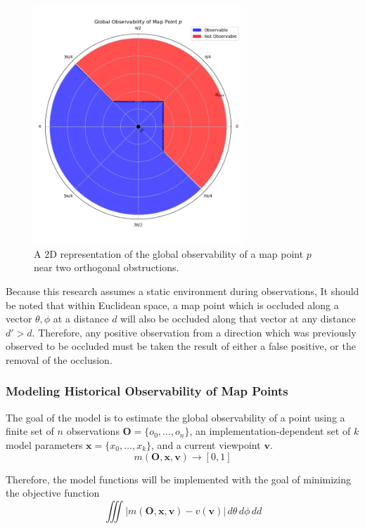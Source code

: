 \begin{figure}[!ht]
    \centering
    \includegraphics[width=0.7\textwidth]{resources/global_observability_p.png}
    \caption[2D Global Observability]{A 2D representation of the global observability of a map point $p$ near two orthogonal obstructions.}
    \label{fig:global_observability_p}
\end{figure}

Because this research assumes a static environment during observations, It should be noted that within Euclidean space, a map point which is occluded along a vector ${\theta,\phi}$ at a distance $d$ will also be occluded along that vector at any distance $d'>d$. Therefore, any positive observation from a direction which was previously observed to be occluded must be taken the result of either a false positive, or the removal of the occlusion. 

\subsubsection{Modeling Historical Observability of Map Points}

The goal of the model is to estimate the global observability of a point using a finite set of $n$ observations $\boldsymbol{O} = \{o_0,\dots,o_n\}$, an implementation-dependent set of $k$ model parameters $\boldsymbol{x}=\{x_0,\dots,x_k\}$, and a current viewpoint $\boldsymbol{v}$.
$$
    m(\boldsymbol{O},\boldsymbol{x},\boldsymbol{v})\to[0,1]
$$

Therefore, the model functions will be implemented with the goal of minimizing the objective function
$$
    \iiint |m(\boldsymbol{O},\boldsymbol{x},\boldsymbol{v}) - v(\boldsymbol{v})| \,d\theta\,d\phi\,dd
$$

